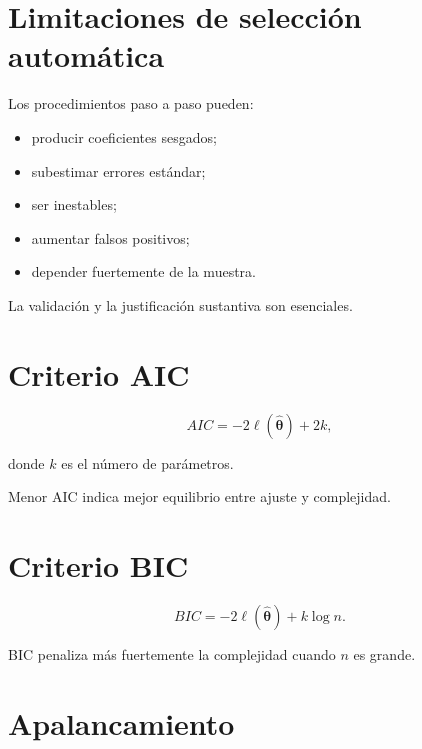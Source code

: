\documentclass[
  spanish,
  10.5pt,
  letterpaper,
  DIV=11,
  numbers=noendperiod,
  oneside,
  open=any]{scrreprt}
\providecommand{\tightlist}{%
  \setlength{\itemsep}{0pt}\setlength{\parskip}{0pt}}
\theoremstyle{definition}
\theoremstyle{definition}
\theoremstyle{plain}
\theoremstyle{remark}
\begin{document}
\section*{Limitaciones de selección
automática}\label{limitaciones-de-selecciuxf3n-automuxe1tica}


Los procedimientos paso a paso pueden:

\begin{itemize}
\tightlist
\item
  producir coeficientes sesgados;
\item
  subestimar errores estándar;
\item
  ser inestables;
\item
  aumentar falsos positivos;
\item
  depender fuertemente de la muestra.
\end{itemize}

La validación y la justificación sustantiva son esenciales.

\section*{Criterio AIC}\label{criterio-aic}


\[
AIC
=
-2\ell(\widehat{\boldsymbol{\theta}})
+
2k,
\]

donde \(k\) es el número de parámetros.

Menor AIC indica mejor equilibrio entre ajuste y complejidad.

\section*{Criterio BIC}\label{criterio-bic}


\[
BIC
=
-2\ell(\widehat{\boldsymbol{\theta}})
+
k\log n.
\]

BIC penaliza más fuertemente la complejidad cuando \(n\) es grande.

\section*{Apalancamiento}\label{apalancamiento}
\end{document}
